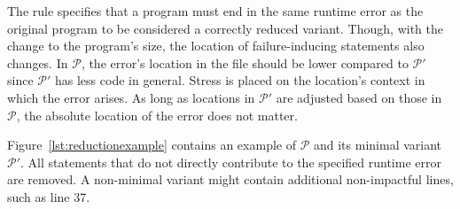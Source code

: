 The rule specifies that a program must end in the same runtime error 
as the original program to be considered a correctly reduced variant.
Though, with the change to the program's size, the location 
of failure-inducing statements also changes.
In $\mathcal{P}$, the error's location in the file should be lower compared 
to $\mathcal{P'}$ since $\mathcal{P'}$ has less code in general.
Stress is placed on the location's context in which the error arises.
As long as locations in $\mathcal{P'}$ are adjusted based on those in 
$\mathcal{P}$, the absolute location of the error does not matter.

Figure~\ref{lst:reductionexample} contains an example of $\mathcal{P}$ and its 
minimal variant $\mathcal{P'}$. 
All statements that do not directly contribute to the specified 
runtime error are removed.
A non-minimal variant might contain additional non-impactful lines, 
such as line 37.

